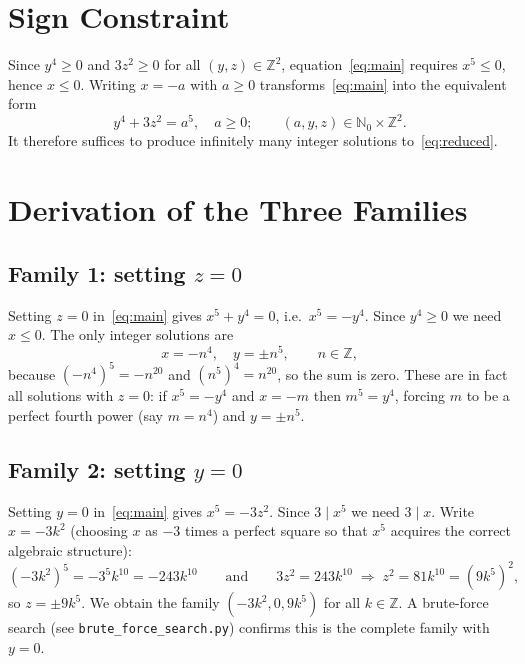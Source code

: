 \documentclass[12pt,a4paper]{article}
\theoremstyle{definition}
\newcommand{\Z}{\mathbb{Z}}
\newcommand{\N}{\mathbb{N}}
\begin{document}
\section{Sign Constraint}\label{sec:sign}

Since $y^4 \geq 0$ and $3z^2 \geq 0$ for all $(y,z)\in\Z^2$, equation~\eqref{eq:main}
requires $x^5 \leq 0$, hence $x \leq 0$.  Writing $x = -a$ with $a \geq 0$
transforms~\eqref{eq:main} into the equivalent form
\begin{equation}\label{eq:reduced}
  y^4 + 3z^2 = a^5, \quad a \geq 0;\qquad (a,y,z)\in\N_0 \times \Z^2. \tag{$\star\star$}
\end{equation}
It therefore suffices to produce infinitely many integer solutions to~\eqref{eq:reduced}.

\section{Derivation of the Three Families}\label{sec:derivation}

\subsection{Family 1: setting \texorpdfstring{$z = 0$}{z = 0}}

Setting $z = 0$ in~\eqref{eq:main} gives $x^5 + y^4 = 0$, i.e.\ $x^5 = -y^4$.
Since $y^4 \geq 0$ we need $x \leq 0$.  The only integer solutions are
\[
  x = -n^4, \quad y = \pm n^5, \qquad n \in \Z,
\]
because $(-n^4)^5 = -n^{20}$ and $(n^5)^4 = n^{20}$, so the sum is zero.
These are in fact all solutions with $z = 0$: if $x^5 = -y^4$ and $x = -m$ then
$m^5 = y^4$, forcing $m$ to be a perfect fourth power (say $m = n^4$) and $y = \pm n^5$.

\subsection{Family 2: setting \texorpdfstring{$y = 0$}{y = 0}}

Setting $y = 0$ in~\eqref{eq:main} gives $x^5 = -3z^2$.
Since $3 \mid x^5$ we need $3 \mid x$.  Write $x = -3k^2$ (choosing $x$ as
$-3$ times a perfect square so that $x^5$ acquires the correct algebraic structure):
\[
  (-3k^2)^5 = -3^5 k^{10} = -243k^{10}
  \qquad\text{and}\qquad
  3z^2 = 243k^{10} \;\Longrightarrow\; z^2 = 81k^{10} = (9k^5)^2,
\]
so $z = \pm 9k^5$.  We obtain the family $(-3k^2, 0, 9k^5)$ for all $k \in \Z$.
A brute-force search (see \texttt{brute\_force\_search.py}) confirms this is the
complete family with $y = 0$.
\end{document}
